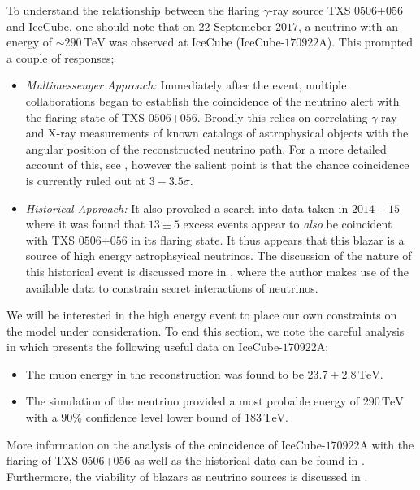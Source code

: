 \documentclass[10pt]{article}
\begin{document}
To understand the relationship between the flaring $\gamma$-ray source TXS $0506$+$056$ and IceCube, one should note that on $22$ Septemeber $2017$, a neutrino with an energy of $\sim 290\,\textrm{TeV}$ was observed at IceCube (IceCube-$170922$A). This prompted a couple of responses;
\begin{itemize}
  \item \textit{Multimessenger Approach:} Immediately after the event, multiple collaborations began to establish the coincidence of the neutrino alert with the flaring state of TXS $0506$+$056$. Broadly this relies on correlating $\gamma$-ray and X-ray measurements of known catalogs of astrophysical objects with the angular position of the reconstructed neutrino path. For a more detailed account of this, see \cite{Ackermann2018}, however the salient point is that the chance coincidence is currently ruled out at $3-3.5\sigma$.
  \item \textit{Historical Approach:} It also provoked a search into data taken in $2014-15$ where it was found that $13 \pm 5$ excess events \cite{Kelly} appear to \textit{also} be coincident with TXS $0506$+$056$ in its flaring state. It thus appears that this blazar is a source of high energy astrophsyical neutrinos. The discussion of the nature of this historical event is discussed more in \cite{Kelly}, where the author makes use of the available data to constrain secret interactions of neutrinos.
\end{itemize}
We will be interested in the high energy event to place our own constraints on the model under consideration. To end this section, we note the careful analysis in \cite{Ackermann2018} which presents the following useful data on IceCube-$170922$A;
\begin{framed}
\begin{itemize}
  \item The muon energy in the reconstruction was found to be $23.7 \pm 2.8\,\textrm{TeV}$.
  \item The simulation of the neutrino provided a most probable energy of $290 \, \textrm{TeV}$ with a $90\%$ confidence level lower bound of $183 \, \textrm{TeV}$.
\end{itemize}
\end{framed}
\noindent More information on the analysis of the coincidence of IceCube-$170922$A with the flaring of TXS $0506$+$056$ as well as the historical data can be found in \cite{Ackermann2018, IceCube2018, Kellya, Padovani2018}. Furthermore, the viability of blazars as neutrino sources is discussed in \cite{Hooper2018, IceCube2018}.
\end{document}
